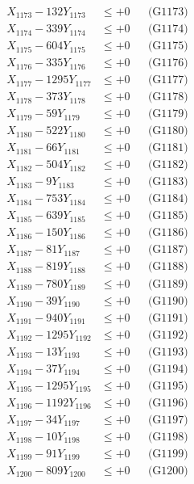 \documentclass[a4paper,10pt]{article}
\begin{document}
{\begin{align}
X_{1173} - 132Y_{1173} &\leq +0 && \text{(G1173)} \\
X_{1174} - 339Y_{1174} &\leq +0 && \text{(G1174)} \\
X_{1175} - 604Y_{1175} &\leq +0 && \text{(G1175)} \\
X_{1176} - 335Y_{1176} &\leq +0 && \text{(G1176)} \\
X_{1177} - 1295Y_{1177} &\leq +0 && \text{(G1177)} \\
X_{1178} - 373Y_{1178} &\leq +0 && \text{(G1178)} \\
X_{1179} - 59Y_{1179} &\leq +0 && \text{(G1179)} \\
X_{1180} - 522Y_{1180} &\leq +0 && \text{(G1180)} \\
\allowbreak
X_{1181} - 66Y_{1181} &\leq +0 && \text{(G1181)} \\
X_{1182} - 504Y_{1182} &\leq +0 && \text{(G1182)} \\
X_{1183} - 9Y_{1183} &\leq +0 && \text{(G1183)} \\
X_{1184} - 753Y_{1184} &\leq +0 && \text{(G1184)} \\
X_{1185} - 639Y_{1185} &\leq +0 && \text{(G1185)} \\
X_{1186} - 150Y_{1186} &\leq +0 && \text{(G1186)} \\
X_{1187} - 81Y_{1187} &\leq +0 && \text{(G1187)} \\
X_{1188} - 819Y_{1188} &\leq +0 && \text{(G1188)} \\
X_{1189} - 780Y_{1189} &\leq +0 && \text{(G1189)} \\
X_{1190} - 39Y_{1190} &\leq +0 && \text{(G1190)} \\
\allowbreak
X_{1191} - 940Y_{1191} &\leq +0 && \text{(G1191)} \\
X_{1192} - 1295Y_{1192} &\leq +0 && \text{(G1192)} \\
X_{1193} - 13Y_{1193} &\leq +0 && \text{(G1193)} \\
X_{1194} - 37Y_{1194} &\leq +0 && \text{(G1194)} \\
X_{1195} - 1295Y_{1195} &\leq +0 && \text{(G1195)} \\
X_{1196} - 1192Y_{1196} &\leq +0 && \text{(G1196)} \\
X_{1197} - 34Y_{1197} &\leq +0 && \text{(G1197)} \\
X_{1198} - 10Y_{1198} &\leq +0 && \text{(G1198)} \\
X_{1199} - 91Y_{1199} &\leq +0 && \text{(G1199)} \\
X_{1200} - 809Y_{1200} &\leq +0 && \text{(G1200)} \\

\end{align}}
\end{document}
